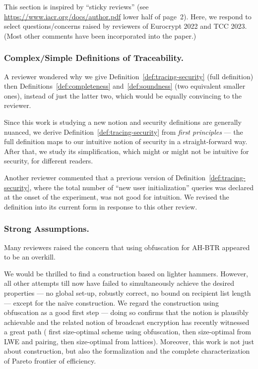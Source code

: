 This section is inspired by ``sticky reviews''
(see \url{https://www.iacr.org/docs/author.pdf} lower half of page~2).
Here, we respond to select questions/concerns raised by reviewers
of Eurocrypt 2022 and TCC 2023.
(Most other comments have been incorporated into the paper.)

\subsubsection{Complex/Simple Definitions of Traceability.}
A reviewer wondered why we give
Definition~\ref{def:tracing-security} (full definition)
then Definitions~\ref{def:completeness} and~\ref{def:soundness}
(two equivalent smaller ones),
instead of just the latter two,
which would be equally convincing to the reviewer.

Since this work is studying a new notion and
security definitions are generally nuanced,
we derive Definition~\ref{def:tracing-security}
from \emph{first principles} ---
the full definition maps to our intuitive notion of security
in a straight-forward way.
After that, we study its simplification,
which might or might not be intuitive for security,
for different readers.

Another reviewer commented that
a previous version of Definition~\ref{def:tracing-security},
where the total number of ``new user initialization'' queries
was declared at the onset of the experiment,
was not good for intuition.
We revised the definition into its current form
in response to this other review.

\subsubsection{Strong Assumptions.}
Many reviewers raised the concern
that using obfuscation for AH-BTR appeared to be an overkill.

We would be thrilled to find a construction based on lighter hammers.
However, all other attempts till now have failed
to simultaneously achieve the desired properties ---
no global set-up,
robustly correct,
no bound on recipient list length ---
except for the na\"ive construction.
We regard the construction using obfuscation as a good first step ---
doing so confirms that the notion is plausibly achievable and
the related notion of broadcast encryption has recently witnessed a great path
(\cite{C:BonWatZha14} first size-optimal scheme using obfuscation, then
\cite{EC:AgrYam20,TCC:AgrWicYam20} size-optimal from LWE and pairing, then
\cite{EC:Wee22} size-optimal from lattices).
Moreover, this work is not just about construction,
but also the formalization and
the complete characterization of Pareto frontier of efficiency.
